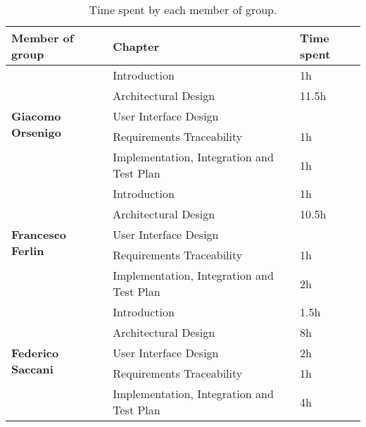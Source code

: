 \begin{table}[H]
    \centering
    \begin{tabular}{|l|l|l|}
        \hline
        \textbf{Member of group }                  & \textbf{Chapter}                          & \textbf{Time spent} \\\hline
        \multirow{5}{*}{\textbf{Giacomo Orsenigo}} & Introduction                              & 1h                  \\
                                                   & Architectural Design                      & 11.5h               \\
                                                   & User Interface Design                     &                     \\
                                                   & Requirements Traceability                 & 1h                  \\
                                                   & Implementation, Integration and Test Plan & 1h                  \\\hline
        \multirow{5}{*}{\textbf{Francesco Ferlin}} & Introduction                              & 1h                  \\
                                                   & Architectural Design                      & 10.5h               \\
                                                   & User Interface Design                     &                     \\
                                                   & Requirements Traceability                 & 1h                  \\
                                                   & Implementation, Integration and Test Plan & 2h                  \\\hline
        \multirow{5}{*}{\textbf{Federico Saccani}} & Introduction                              & 1.5h                \\
                                                   & Architectural Design                      & 8h                  \\
                                                   & User Interface Design                     & 2h                  \\
                                                   & Requirements Traceability                 & 1h                  \\
                                                   & Implementation, Integration and Test Plan & 4h                  \\\hline
    \end{tabular}
    \caption{Time spent by each member of group.}
    \label{table:Time spent}
\end{table}
